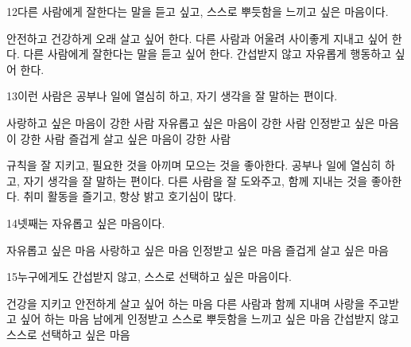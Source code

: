 \documentclass[fs85,seriesRus]{korfarm-base}
\begin{document}
\begin{kfSentenceUnit}{12}{다른 사람에게 잘한다는 말을 듣고 싶고, 스스로 뿌듯함을 느끼고 싶은 마음이다.}
\begin{kfChoices}
\kfChoice 안전하고 건강하게 오래 살고 싶어 한다.
\kfChoice 다른 사람과 어울려 사이좋게 지내고 싶어 한다.
\kfChoice 다른 사람에게 잘한다는 말을 듣고 싶어 한다.
\kfChoice 간섭받지 않고 자유롭게 행동하고 싶어 한다.
\end{kfChoices}
\end{kfSentenceUnit}

\begin{kfSentenceUnit}{13}{이런 사람은 공부나 일에 열심히 하고, 자기 생각을 잘 말하는 편이다.}
\begin{kfChoices}
\kfChoice 사랑하고 싶은 마음이 강한 사람
\kfChoice 자유롭고 싶은 마음이 강한 사람
\kfChoice 인정받고 싶은 마음이 강한 사람
\kfChoice 즐겁게 살고 싶은 마음이 강한 사람
\end{kfChoices}
\begin{kfChoices}
\kfChoice 규칙을 잘 지키고, 필요한 것을 아끼며 모으는 것을 좋아한다.
\kfChoice 공부나 일에 열심히 하고, 자기 생각을 잘 말하는 편이다.
\kfChoice 다른 사람을 잘 도와주고, 함께 지내는 것을 좋아한다.
\kfChoice 취미 활동을 즐기고, 항상 밝고 호기심이 많다.
\end{kfChoices}
\end{kfSentenceUnit}

\begin{kfSentenceUnit}{14}{넷째는 자유롭고 싶은 마음이다.}
\begin{kfChoices}
\kfChoice 자유롭고 싶은 마음
\kfChoice 사랑하고 싶은 마음
\kfChoice 인정받고 싶은 마음
\kfChoice 즐겁게 살고 싶은 마음
\end{kfChoices}
\end{kfSentenceUnit}

\begin{kfSentenceUnit}{15}{누구에게도 간섭받지 않고, 스스로 선택하고 싶은 마음이다.}
\begin{kfChoices}
\kfChoice 건강을 지키고 안전하게 살고 싶어 하는 마음
\kfChoice 다른 사람과 함께 지내며 사랑을 주고받고 싶어 하는 마음
\kfChoice 남에게 인정받고 스스로 뿌듯함을 느끼고 싶은 마음
\kfChoice 간섭받지 않고 스스로 선택하고 싶은 마음
\end{kfChoices}
\end{kfSentenceUnit}
\end{document}
